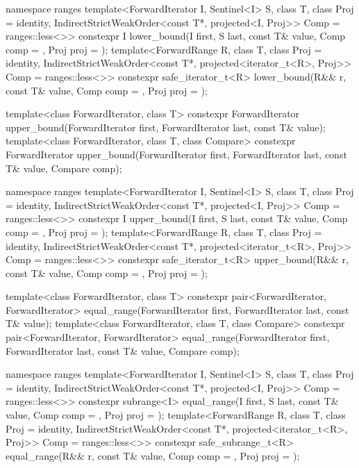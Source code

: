 \begin{codeblock}
{  namespace ranges {
    template<ForwardIterator I, Sentinel<I> S, class T, class Proj = identity,
             IndirectStrictWeakOrder<const T*, projected<I, Proj>> Comp = ranges::less<>>
      constexpr I lower_bound(I first, S last, const T& value, Comp comp = {},
                              Proj proj = {});
    template<ForwardRange R, class T, class Proj = identity,
             IndirectStrictWeakOrder<const T*, projected<iterator_t<R>, Proj>> Comp =
               ranges::less<>>
      constexpr safe_iterator_t<R>
        lower_bound(R&& r, const T& value, Comp comp = {}, Proj proj = {});
  }

  template<class ForwardIterator, class T>
    constexpr ForwardIterator
      upper_bound(ForwardIterator first, ForwardIterator last,
                  const T& value);
  template<class ForwardIterator, class T, class Compare>
    constexpr ForwardIterator
      upper_bound(ForwardIterator first, ForwardIterator last,
                  const T& value, Compare comp);

  namespace ranges {
    template<ForwardIterator I, Sentinel<I> S, class T, class Proj = identity,
             IndirectStrictWeakOrder<const T*, projected<I, Proj>> Comp = ranges::less<>>
      constexpr I upper_bound(I first, S last, const T& value, Comp comp = {}, Proj proj = {});
    template<ForwardRange R, class T, class Proj = identity,
             IndirectStrictWeakOrder<const T*, projected<iterator_t<R>, Proj>> Comp =
               ranges::less<>>
      constexpr safe_iterator_t<R>
        upper_bound(R&& r, const T& value, Comp comp = {}, Proj proj = {});
  }

  template<class ForwardIterator, class T>
    constexpr pair<ForwardIterator, ForwardIterator>
      equal_range(ForwardIterator first, ForwardIterator last,
                  const T& value);
  template<class ForwardIterator, class T, class Compare>
    constexpr pair<ForwardIterator, ForwardIterator>
      equal_range(ForwardIterator first, ForwardIterator last,
                  const T& value, Compare comp);

  namespace ranges {
    template<ForwardIterator I, Sentinel<I> S, class T, class Proj = identity,
             IndirectStrictWeakOrder<const T*, projected<I, Proj>> Comp = ranges::less<>>
      constexpr subrange<I>
        equal_range(I first, S last, const T& value, Comp comp = {}, Proj proj = {});
    template<ForwardRange R, class T, class Proj = identity,
             IndirectStrictWeakOrder<const T*, projected<iterator_t<R>, Proj>> Comp =
               ranges::less<>>
      constexpr safe_subrange_t<R>
        equal_range(R&& r, const T& value, Comp comp = {}, Proj proj = {});
  }

}
\end{codeblock}

